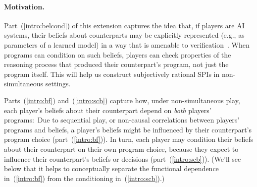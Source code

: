 \documentclass[sigconf]{aamas}
\theoremstyle{definition}
\begin{document}
\paragraph{Motivation.}
Part~(\ref{intro:belcond}) of this extension captures the idea that, if players are AI systems, their beliefs about counterparts may be explicitly represented (e.g., as parameters of a learned model) in a way that is amenable to verification~\citep{foerster2019bayesian, wang2022model}.
When programs can condition on such beliefs,
players can check properties of the reasoning process that produced their counterpart's program, not just the program itself.
This will help us construct subjectively rational SPIs in non-simultaneous settings.

Parts~(\ref{intro:bf}) and~(\ref{intro:scb}) capture how, under non-simultaneous play, each player's beliefs about their counterpart
depend on \textit{both} players' programs:\ Due to sequential play, or non-causal correlations between players' programs and beliefs,
a player's beliefs might be influenced by their counterpart's program choice (part~(\ref{intro:bf})). In turn, each player may condition their beliefs
about their counterpart on their own program choice, 
because they expect to influence their counterpart's beliefs or decisions (part~(\ref{intro:scb})).
(We'll see below
that it helps to conceptually separate the functional dependence in~(\ref{intro:bf})
from the conditioning in~(\ref{intro:scb}).)




\end{document}
